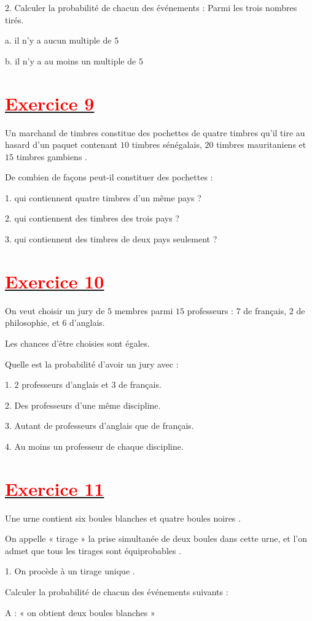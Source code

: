 \documentclass[12pt]{article}
\begin{document}
2. Calculer la probabilité de chacun des événements : Parmi les trois nombres tirés.

a. il n'y a aucun multiple de $5$

b. il n'y a au moins un multiple de $5$
\section*{\underline{\textbf{\textcolor{red}{Exercice 9}}}}
Un marchand de timbres constitue des pochettes de quatre timbres qu'il tire au hasard d'un paquet contenant $10$ timbres sénégalais, $20$ timbres mauritaniens et $15$ timbres gambiens .

De combien de façons peut-il constituer des pochettes :

1. qui contiennent quatre timbres d'un même pays ?

2. qui contiennent des timbres des trois pays ?

3. qui contiennent des timbres de deux pays seulement ?
\section*{\underline{\textbf{\textcolor{red}{Exercice 10}}}}
On veut choisir un jury de $5$ membres parmi $15$ professeurs : $7$ de français, $2$ de philosophie, et $6$ d'anglais.

Les chances d'être choisies sont égales.

Quelle est la probabilité d'avoir un jury avec :
	
1. $2$ professeurs d'anglais et $3$ de français.

2. Des professeurs d'une même discipline.

3. Autant de professeurs d'anglais que de français.

4. Au moins un professeur de chaque discipline.
\section*{\underline{\textbf{\textcolor{red}{Exercice 11}}}}
Une urne contient six boules blanches et quatre boules noires .

	On appelle « tirage » la prise simultanée de deux boules dans cette urne, et l'on admet que tous les tirages sont équiprobables .

1. On procède à un tirage unique .

Calculer la probabilité de chacun des événements suivants :

A : « on obtient deux boules blanches »
\end{document}
